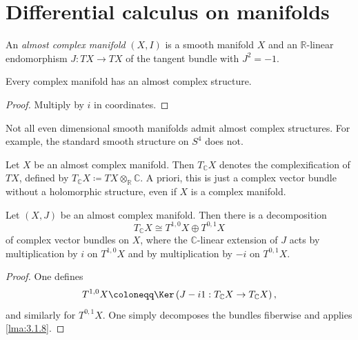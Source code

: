 \section{Differential calculus on manifolds}


\begin{definition}\label{dfn:3.2.1}
	An \emph{almost complex manifold} $(X,I)$ is a smooth manifold $X$ and an $\mathbb{R} $-linear endomorphism $J : TX \to TX$ of the tangent bundle with $J^2=-1$.
\end{definition}
\begin{proposition}\label{prp:3.2.2}
	Every complex manifold has an almost complex structure.
\end{proposition}
\begin{proof}
	Multiply by $i$ in coordinates.
\end{proof}

\begin{remark}\label{rmk:3.2.3}
	Not all even dimensional smooth manifolds admit almost complex structures. For example, the standard smooth structure on $S^4$ does not.
\end{remark}

\begin{definition}\label{dfn:3.2.4}
	Let $X$ be an almost complex manifold. Then $T_\mathbb{C} X$ denotes the complexification of $TX$, defined by $T_\mathbb{C} X\coloneqq TX \otimes _\mathbb{R} \mathbb{C} $. A priori, this is just a complex vector bundle without a holomorphic structure, even if $X$ is a complex manifold.
\end{definition}

\begin{proposition}\label{prp:3.2.5}
	Let $(X,J)$ be an almost complex manifold. Then there is a decomposition
	\[
		T_\mathbb{C} X \cong T^{1,0} X \oplus T^{0,1} X
	\]
	of complex vector bundles on $X$, where the $\mathbb{C} $-linear extension of $J$ acts by multiplication by $i$ on $T^{1,0} X$ and by multiplication by $-i$ on $T^{0,1} X$.
\end{proposition}
\begin{proof}
	One defines
	\[
		T^{1,0} X \coloneqq \Ker \left( J - i\mathrm{1} : T_\mathbb{C} X \to T_\mathbb{C} X \right) ,
	\]
	and similarly for $T^{0,1} X$. One simply decomposes the bundles fiberwise and applies \cref{lma:3.1.8}.
\end{proof}

